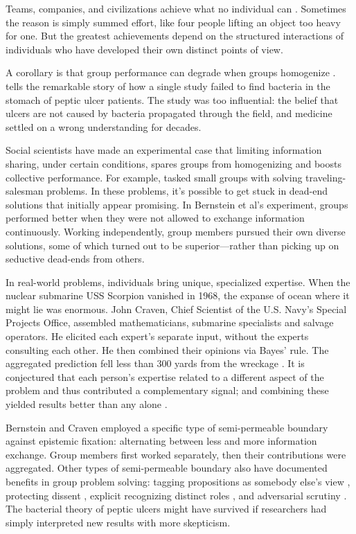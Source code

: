 \documentclass[11pt]{article}
\begin{document}
Teams, companies, and civilizations achieve what no individual can \citep{woolley2010evidence, hutchins1995cognition}. Sometimes the reason is simply summed effort, like four people lifting an object too heavy for one. But the greatest achievements depend on the structured interactions of individuals who have developed their own distinct points of view.

A corollary is that group performance can degrade when groups homogenize \citep{lorenz2011social, lazer2007network, hong2004groups, frey2021social, janis1972victims, bernstein2018intermittent}. \cite{zollman2010epistemic} tells the remarkable story of how a single study failed to find bacteria in the stomach of peptic ulcer patients. The study was too influential: the belief that ulcers are not caused by bacteria propagated through the field, and medicine settled on a wrong understanding for decades.

Social scientists have made an experimental case that limiting information sharing, under certain conditions, spares groups from homogenizing and boosts collective performance. For example, \cite{bernstein2018intermittent} tasked small groups with solving traveling-salesman problems. In these problems, it's possible to get stuck in dead-end solutions that initially appear promising. In Bernstein et al's experiment, groups performed better when they were not allowed to exchange information continuously. Working independently, group members pursued their own diverse solutions, some of which turned out to be superior---rather than picking up on seductive dead-ends from others.

In real-world problems, individuals bring unique, specialized expertise. When the nuclear submarine USS Scorpion vanished in 1968, the expanse of ocean where it might lie was enormous. John Craven, Chief Scientist of the U.S. Navy's Special Projects Office, assembled mathematicians, submarine specialists and salvage operators. He elicited each expert's separate input, without the experts consulting each other. He then combined their opinions via Bayes' rule. The aggregated prediction fell less than 300 yards from the wreckage \citep{richardson1971operations, sontag1998blind}. It is conjectured that each person's expertise related to a different aspect of the problem and thus contributed a complementary signal; and combining these yielded results better than any alone \citep{surowiecki2005wisdom}.

Bernstein and Craven employed a specific type of semi-permeable boundary against epistemic fixation: alternating between less and more information exchange. Group members first worked separately, then their contributions were aggregated. Other types of semi-permeable boundary also have documented benefits in group problem solving: tagging propositions as somebody else's view \citep{johnson1993source}, protecting dissent \citep{sunstein2015wiser}, explicit recognizing distinct roles \citep{hutchins1995cognition}, and adversarial scrutiny \citep{longino1990science}. The bacterial theory of peptic ulcers might have survived if researchers had simply interpreted new results with more skepticism.
\end{document}
